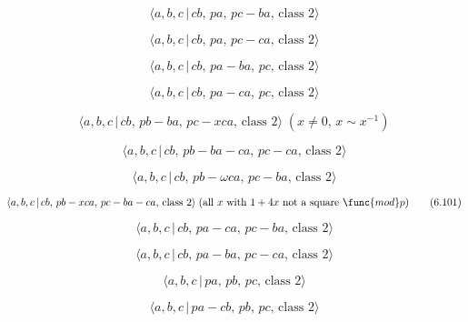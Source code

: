 \documentclass[10pt]{article}
\begin{document}
\begin{equation}
\langle a,b,c\,|\,cb,\,pa,\,pc-ba,\,\text{class }2\rangle  \tag{6.94}
\end{equation}

\begin{equation}
\langle a,b,c\,|\,cb,\,pa,\,pc-ca,\,\text{class }2\rangle  \tag{6.95}
\end{equation}

\begin{equation}
\langle a,b,c\,|\,cb,\,pa-ba,\,pc,\,\text{class }2\rangle  \tag{6.96}
\end{equation}

\begin{equation}
\langle a,b,c\,|\,cb,\,pa-ca,\,pc,\,\text{class }2\rangle  \tag{6.97}
\end{equation}

\begin{equation}
\langle a,b,c\,|\,cb,\,pb-ba,\,pc-xca,\,\text{class }2\rangle \;(x\neq
0,\,x\sim x^{-1})  \tag{6.98}
\end{equation}

\begin{equation}
\langle a,b,c\,|\,cb,\,pb-ba-ca,\,pc-ca,\,\text{class }2\rangle  \tag{6.99}
\end{equation}

\begin{equation}
\langle a,b,c\,|\,cb,\,pb-\omega ca,\,pc-ba,\,\text{class }2\rangle 
\tag{6.100}
\end{equation}

\begin{equation}
\langle a,b,c\,|\,cb,\,pb-xca,\,pc-ba-ca,\,\text{class }2\rangle \;(\text{%
all }x\text{ with }1+4x\text{ not a square }\func{mod}p)  \tag{6.101}
\end{equation}

\begin{equation}
\langle a,b,c\,|\,cb,\,pa-ca,\,pc-ba,\,\text{class }2\rangle  \tag{6.102}
\end{equation}

\begin{equation}
\langle a,b,c\,|\,cb,\,pa-ba,\,pc-ca,\,\text{class }2\rangle  \tag{6.103}
\end{equation}

\begin{equation}
\langle a,b,c\,|\,pa,\,pb,\,pc,\,\text{class }2\rangle  \tag{6.104}
\end{equation}

\begin{equation}
\langle a,b,c\,|\,pa-cb,\,pb,\,pc,\,\text{class }2\rangle  \tag{6.105}
\end{equation}
\end{document}
